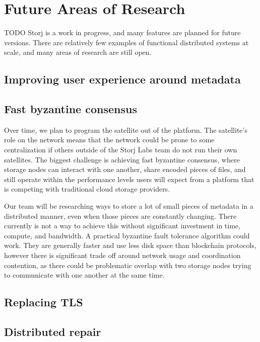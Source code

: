 \documentclass[11pt,fleqn,openany]{book}
\newcommand{\todo}[1]{{\color{red} TODO #1 }}
\begin{document}
\chapter{Future Areas of Research}\label{chap:future-work}

\todo{ Storj is a work in progress, and many features are planned for future
versions. There are relatively few examples of functional distributed systems at
scale, and many areas of research are still open. }

\section{Improving user experience around metadata}

\section{Fast byzantine consensus}

Over time, we plan to program the satellite out of the platform.
The satellite's role on the network means that the network could be prone
to some
centralization if others outside of the Storj Labs team do not run their own
satellites. The biggest challenge is achieving fast byzantine consensus,
where storage nodes can interact with one another, share encoded pieces of
files,
and still operate within the performance levels users will expect from a
platform that is competing with traditional cloud storage providers.

Our team will be researching ways to store a lot of small pieces of metadata
in a distributed manner, even when those pieces are constantly changing. There
currently is not a way to achieve this without significant investment in time,
compute, and bandwidth. A practical byzantine fault tolerance algorithm could
work. They are generally faster and use less disk space than blockchain
protocols, however there is significant trade off around network usage and
coordination contention, as there could be problematic overlap with two storage
nodes trying to communicate with one another at the same time.

\section{Replacing TLS}\label{sec:future-work-tls}

\section{Distributed repair}\label{sec:future-distributed-repair}
\end{document}
